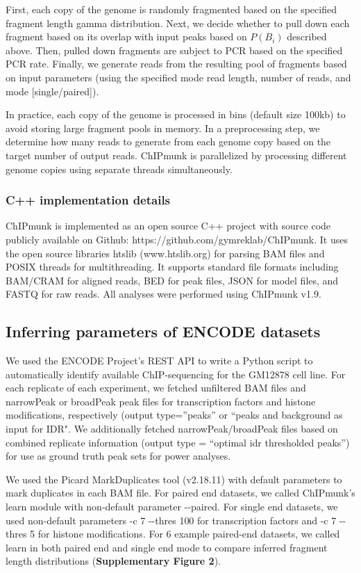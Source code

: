\documentclass[12pt]{article}
\begin{document}
First, each copy of the genome is randomly fragmented based on the specified fragment length gamma distribution.
Next, we decide whether to pull down each fragment based on its overlap with input peaks based on $P(B_i)$ described above.
Then, pulled down fragments are subject to PCR based on the specified PCR rate.
Finally, we generate reads from the resulting pool of fragments based on input parameters (using the specified mode read length, number of reads, and mode [single/paired]).

In practice, each copy of the genome is processed in bins (default size 100kb) to avoid storing large fragment pools in memory.
In a preprocessing step, we determine how many reads to generate from each genome copy based on the target number of output reads.
ChIPmunk is parallelized by processing different genome copies using separate threads simultaneously.

\subsubsection*{C++ implementation details}
ChIPmunk is implemented as an open source C++ project with source code publicly available on Github: https://github.com/gymreklab/ChIPmunk.
It uses the open source libraries htslib (www.htslib.org) for parsing BAM files and POSIX threads for multithreading.
It supports standard file formats including BAM/CRAM for aligned reads, BED for peak files, JSON for model files, and FASTQ for raw reads.
All analyses were performed using ChIPmunk v1.9.

\subsection*{Inferring parameters of ENCODE datasets}

We used the ENCODE Project's REST API to write a Python script to automatically identify available ChIP-sequencing for the GM12878 cell line.
For each replicate of each experiment, we fetched unfiltered BAM files and narrowPeak or broadPeak peak files for transcription factors and histone modifications, respectively (output type=''peaks'' or ``peaks and background as input for IDR".
We additionally fetched narrowPeak/broadPeak files based on combined replicate information (output type = ``optimal idr thresholded peaks'') for use as ground truth peak sets for power analyses.

We used the Picard \cite{picard} MarkDuplicates tool (v2.18.11) with default parameters to mark duplicates in each BAM file.
For paired end datasets, we called ChIPmunk's learn module with non-default parameter -{}-paired.
For single end datasets, we used non-default parameters -c 7 -{}-thres 100 for transcription factors and -c 7 -{}-thres 5 for histone modifications.
For 6 example paired-end datasets, we called learn in both paired end and single end mode to compare inferred fragment length distributions (\textbf{Supplementary Figure 2}).
\end{document}
